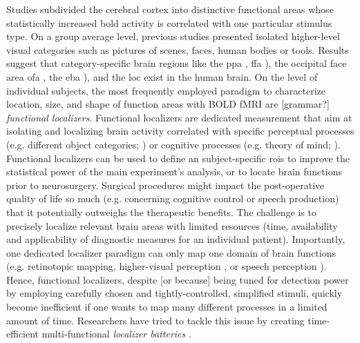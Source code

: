 Studies subdivided the cerebral cortex into distinctive functional areas whose
statistically increased \ac{bold} activity is correlated with one particular
stimulus type.
On a group average level, previous studies presented isolated higher-level
visual categories such as pictures of scenes, faces, human bodies or tools.
Results suggest that category-specific brain regions like the \ac{ppa}
\citep{epstein1998ppa}, \ac{ffa} \citep{kanwisher1997ffa}), the occipital face
area \ac{ofa} \citep{pitcher2011occipitalfacearea}, the \ac{eba}
\citep{downing2001bodyarea}), and the \ac{loc} \citet{malach1995loc} exist in
the human brain.
On the level of individual subjects, the most frequently employed paradigm to
characterize location, size, and shape of function areas with BOLD fMRI are
[grammar?] \textit{functional localizers}.
Functional localizers are dedicated measurement that aim at isolating and
localizing brain activity correlated with specific perceptual processes (e.g.
different object categories; \citet{kanwisher1997ffa}) or cognitive processes
(e.g. theory of mind; \citet{spunt2014validating}).
Functional localizers can be used to define an subject-specific \acp{roi} to
improve the statistical power of the main experiment's analysis, or to locate
brain functions prior to neurosurgery.
Surgical procedures might impact the post-operative quality of life so much
(e.g. concerning cognitive control or speech production) that it potentially
outweighs the therapeutic benefits.
The challenge is to precisely localize relevant brain areas with limited
resources (time, availability and applicability of diagnostic measures for an
individual patient).
Importantly, one dedicated localizer paradigm can only map one domain of brain
functions (e.g. retinotopic mapping, higher-visual perception
\citet{kanwisher1997ffa}, or speech perception
\citet{fernandez2001language}).
Hence, functional localizers, despite [or because] being tuned for detection
power by employing carefully chosen and tightly-controlled, simplified stimuli,
quickly become inefficient if one wants to map many different processes in a
limited amount of time.
Researchers have tried to tackle this issue by creating time-efficient
multi-functional \textit{localizer batteries} \citep{pinel2007fast,
pinho2018individual, pinho2020individual}. 
